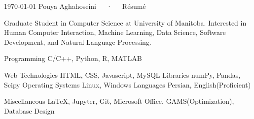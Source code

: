 \documentclass[11pt, a4paper]{awesome-cv}
\begin{document}
\makecvheader[C]

\makecvfooter
  {\today}
  {Pouya Aghahoseini~~~·~~~Résumé}
  {\thepage}


\begin{cvparagraph}
	
	Graduate Student in Computer Science at University of Manitoba.
	Interested in Human Computer Interaction, Machine Learning, Data Science, Software Development, and Natural Language Processing.
	
\end{cvparagraph}


\begin{cvskills}
	\cvskill
	{Programming} %
	{C/C++, Python, R, MATLAB} %
	
	\cvskill
	{Web Technologies} %
	{HTML, CSS, Javascript, MySQL} %
	\cvskill
	{Libraries} %
	{numPy, Pandas, Scipy} %
	\cvskill
	{Operating Systems} %
	{Linux, Windows}
	\cvskill
	{Languages} %
	{Persian, English(Proficient)}	
	
	\cvskill
	{Miscellaneous}
	{\LaTeX, Jupyter, Git, Microsoft Office, GAMS(Optimization), Database Design}%
	
\end{cvskills}
\end{document}
